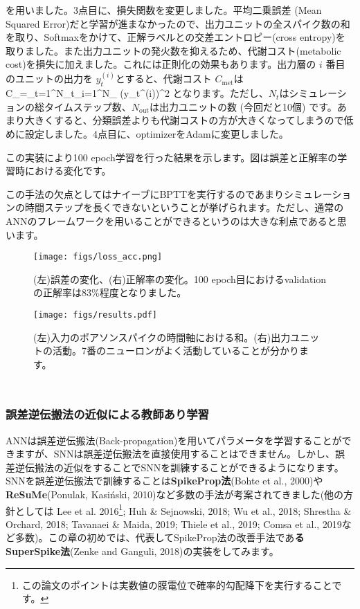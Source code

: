を用いました。3点目に、損失関数を変更しました。平均二乗誤差 (Mean Squared Error)だと学習が進まなかったので、出力ユニットの全スパイク数の和を取り、Softmaxをかけて、正解ラベルとの交差エントロピー(cross entropy)を取りました。また出力ユニットの発火数を抑えるため、代謝コスト(metabolic cost)を損失に加えました。これには正則化の効果もあります。出力層の $i$ 番目のユニットの出力を $y_t^{(i)}$とすると、代謝コスト $C_{\text{met}}$は 
C_{}=\sum_{t=1}^{N_t}\sum_{i=1}^{N_{}} \left(y_t^{(i)}\right)^2 
となります。ただし、$N_t$はシミュレーションの総タイムステップ数、$N_{\text{out}}$は出力ユニットの数 (今回だと10個) です。あまり大きくすると、分類誤差よりも代謝コストの方が大きくなってしまうので低めに設定しました。4点目に、optimizerをAdamに変更しました。\par
この実装により100 epoch学習を行った結果を示します。図は誤差と正解率の学習時における変化です。\par
この手法の欠点としてはナイーブにBPTTを実行するのであまりシミュレーションの時間ステップを長くできないということが挙げられます。ただし、通常のANNのフレームワークを用いることができるというのは大きな利点であると思います。
\begin{figure}[htbp]
    \centering
    \texttt{[image: figs/loss\_acc.png]}
    \caption{(左)誤差の変化、(右)正解率の変化。100 epoch目におけるvalidationの正解率は83\%程度となりました。}
    \label{fig:snu_1}
\end{figure}
\begin{figure}[htbp]
    \centering
    \texttt{[image: figs/results.pdf]}
    \caption{(左)入力のポアソンスパイクの時間軸における和。(右)出力ユニットの活動。7番のニューロンがよく活動していることが分かります。}
    \label{fig:snu_2}
\end{figure}
\begin{lstlisting}[language=julia]

\end{lstlisting}
\begin{lstlisting}[language=julia]

\end{lstlisting}
\subsubsection{誤差逆伝搬法の近似による教師あり学習}
ANNは誤差逆伝搬法(Back-propagation)を用いてパラメータを学習することができますが、SNNは誤差逆伝搬法を直接使用することはできません。しかし、誤差逆伝搬法の近似をすることでSNNを訓練することができるようになります。SNNを誤差逆伝搬法で訓練することは\textbf{SpikeProp法}(Bohte et al., 2000)や\textbf{ReSuMe}(Ponulak, Kasiński, 2010)など多数の手法が考案されてきました(他の方針としては Lee et al. 2016\footnote{この論文のポイントは実数値の膜電位で確率的勾配降下を実行することです。}; Huh \& Sejnowski, 2018; Wu et al., 2018; Shrestha \& Orchard, 2018; Tavanaei \& Maida, 2019; Thiele et al., 2019; Comsa et al., 2019など多数)。この章の初めでは、代表してSpikeProp法の改善手法であ\textbf{るSuperSpike法}(Zenke and Ganguli, 2018)の実装をしてみます。
